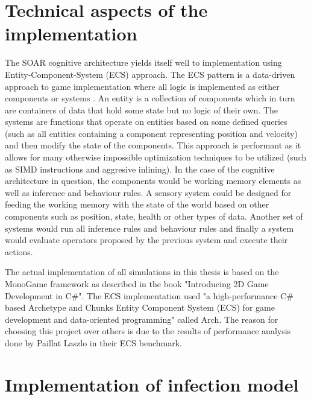 
\section{Technical aspects of the implementation}

The SOAR cognitive architecture yields itself well to implementation using Entity-Component-System (ECS) approach.
The ECS pattern is a data-driven approach to game implementation where all logic is implemented as either components or systems \cite{raffaillac2019polyphony}.
An entity is a collection of components which in turn are containers of data that hold some state but no logic of their own.
The systems are functions that operate on entities based on some defined queries (such as all entities containing a component representing position and velocity) and then modify the state of the components.
This approach is performant as it allows for many otherwise impossible optimization techniques to be utilized (such as SIMD instructions and aggresive inlining)\cite{harkonen2019advantages}.
In the case of the cognitive architecture in question, the components would be working memory elements as well as inference and behaviour rules.
A sensory system could be designed for feeding the working memory with the state of the world based on other components such as position, state, health or other types of data.
Another set of systems would run all inference rules and behaviour rules and finally a system would evaluate operators proposed by the previous system and execute their actions.

The actual implementation of all simulations in this thesis is based on the MonoGame framework as described in the book "Introducing 2D Game Development in C\#"\cite{pavleas2013introducing}.
The ECS implementation used "a high-performance C\# based Archetype and Chunks Entity Component System (ECS) for game development and data-oriented programming" called Arch\cite{matthaeus2023arch}.
The reason for choosing this project over others is due to the results of performance analysis done by Paillat Laszlo in their ECS benchmark\cite{laszlo2023arch}.

\section{Implementation of infection model}

